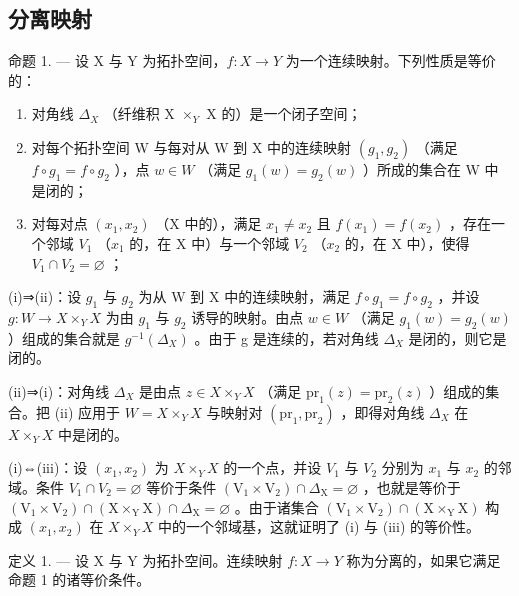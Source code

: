 \subsection{分离映射}

命题 1. --- 设 X 与 Y 为拓扑空间，\(f\colon X \to Y\) 为一个连续映射。下列性质是等价的：

\begin{enumerate}
\def\labelenumi{(\roman{enumi})}
\item
  对角线 \(\Delta_{X}\) （纤维积 X \(\times_{Y}\) X 的）是一个闭子空间；
\item
  对每个拓扑空间 W 与每对从 W 到 X 中的连续映射 \((g_{1}, g_{2})\) （满足 \(f \circ g_{1} = f \circ g_{2}\) ），点 \(w \in W\) （满足 \(g_{1}(w) = g_{2}(w)\) ）所成的集合在 W 中是闭的；
\item
  对每对点 \((x_{1}, x_{2})\) （X 中的），满足 \(x_{1} \neq x_{2}\) 且 \(f(x_{1}) = f(x_{2})\) ，存在一个邻域 \(V_{1}\) （\(x_{1}\) 的，在 X 中）与一个邻域 \(V_{2}\) （\(x_{2}\) 的，在 X 中），使得 \(V_{1} \cap V_{2} = \varnothing\) ；
\end{enumerate}

(i)⇒(ii)：设 \(g_{1}\) 与 \(g_{2}\) 为从 W 到 X 中的连续映射，满足 \(f \circ g_{1} = f \circ g_{2}\) ，并设 \(g: W \to X \times_{Y} X\) 为由 \(g_{1}\) 与 \(g_{2}\) 诱导的映射。由点 \(w \in W\) （满足 \(g_{1}(w) = g_{2}(w)\) ）组成的集合就是 \(g^{-1}(\Delta_{X})\) 。由于 g 是连续的，若对角线 \(\Delta_{X}\) 是闭的，则它是闭的。

(ii)⇒(i)：对角线 \(\Delta_{X}\) 是由点 \(z \in X \times_{Y} X\) （满足 \(\mathrm{pr}_{1}(z) = \mathrm{pr}_{2}(z)\) ）组成的集合。把 (ii) 应用于 \(W = X \times_{Y} X\) 与映射对 \((\mathrm{pr}_{1}, \mathrm{pr}_{2})\) ，即得对角线 \(\Delta_{X}\) 在 \(X \times_{Y} X\) 中是闭的。

(i)⇔(iii)：设 \((x_{1}, x_{2})\) 为 \(X \times_{Y} X\) 的一个点，并设 \(V_{1}\) 与 \(V_{2}\) 分别为 \(x_{1}\) 与 \(x_{2}\) 的邻域。条件 \(V_{1} \cap V_{2} = \varnothing\) 等价于条件 \((\mathrm{V}_{1} \times \mathrm{V}_{2}) \cap \Delta_{\mathrm{X}} = \varnothing\) ，也就是等价于 \((\mathrm{V}_{1} \times \mathrm{V}_{2}) \cap (\mathrm{X} \times_{\mathrm{Y}} \mathrm{X}) \cap \Delta_{\mathrm{X}} = \varnothing\) 。由于诸集合 \((\mathrm{V}_{1} \times \mathrm{V}_{2}) \cap (\mathrm{X} \times_{\mathrm{Y}} \mathrm{X})\) 构成 \((x_{1}, x_{2})\) 在 \(X \times_{Y} X\) 中的一个邻域基，这就证明了 (i) 与 (iii) 的等价性。

定义 1. --- 设 X 与 Y 为拓扑空间。连续映射 \(f: X \to Y\) 称为分离的，如果它满足命题 1 的诸等价条件。

